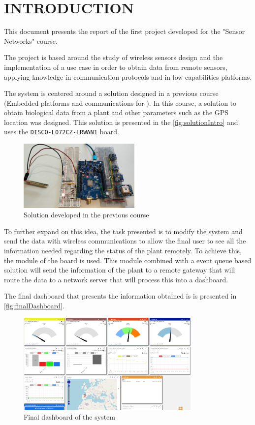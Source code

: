 \section{INTRODUCTION}

This document presents the report of the first project developed for the "Sensor Networks" course.

The project is based around the study of wireless sensors design and the implementation of a use case in order to obtain data from remote sensors, applying knowledge in communication protocols and in low capabilities platforms.

The system is centered around a solution designed in a previous course (Embedded platforms and communications for ). In this course, a solution to obtain biological data from a plant and other parameters such as the 
GPS location was designed\cite{RyvenKappaEPCIoT_Final_Project}. This solution is presented in the \autoref{fig:solutionIntro} and uses the \texttt{DISCO-L072CZ-LRWAN1} board.
\begin{figure}[H]
    \centering
    \includegraphics[width=0.53\textwidth]{images/1/sistema.png}
    \caption{Solution developed in the previous course}
    \label{fig:solutionIntro}
\end{figure}

To further expand on this idea, the task presented is to modify the system and send the data with wireless communications to allow the final user to see all the information needed regarding the status of the plant 
remotely. To achieve this, the  module of the board is used. This module combined with a event queue based solution will send the information of the plant to 
a remote gateway that will route the data to a network server that will process this into a dashboard.

The final dashboard that presents the information obtained is is presented in \autoref{fig:finalDashboard}.
\begin{figure}[H]
    \centering
    \includegraphics[width=0.8\textwidth]{images/1/FinalDashboard.png}
    \caption{Final dashboard of the system}
    \label{fig:finalDashboard}
\end{figure}